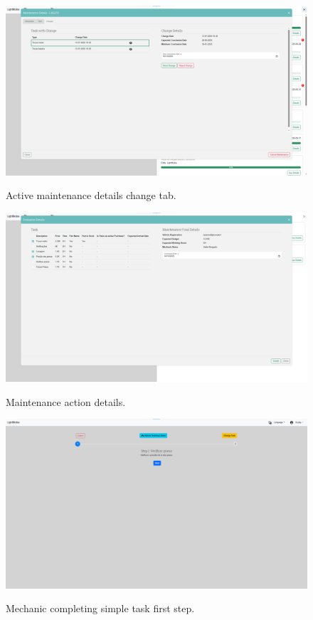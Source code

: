 \begin{figure}[htbp]
  \caption{Active maintenance details change tab.}
  \centering
  \includegraphics[width=\textwidth]{figs/Implementation/rececionist/maintenance_details_change}
  \label{fig:impReceMaintChange}
\end{figure}

\begin{figure}[htbp]
  \caption{Maintenance action details.}
  \centering
  \includegraphics[width=\textwidth]{figs/Implementation/rececionist/action_details}
  \label{fig:impReceActionHome}
\end{figure}

\begin{figure}[htbp]
  \caption{Mechanic completing simple task first step.}
  \centering
  \includegraphics[width=\textwidth]{figs/Implementation/mechanic/MechanicTaskNormal}
  \label{fig:MechanicTaskNormal}
\end{figure}



